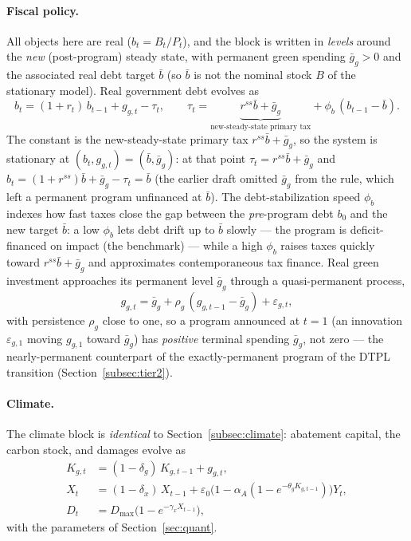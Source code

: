 \documentclass[12pt]{article}
\begin{document}
\paragraph{Fiscal policy.} All objects here are real ($b_t=B_t/P_t$), and the
block is written in \emph{levels} around the \emph{new} (post-program) steady
state, with permanent green spending $\bar g_g>0$ and the associated real debt
target $\bar b$ (so $\bar b$ is not the nominal stock $B$ of the stationary
model). Real government debt evolves as
\begin{equation}
b_t = (1+r_t)\,b_{t-1} + g_{g,t} - \tau_t, \qquad
\tau_t = \underbrace{r^{ss}\bar b + \bar g_g}_{\text{new-steady-state primary tax}}
        + \phi_b\,(b_{t-1}-\bar b).
\label{eq:nk-fiscal}
\end{equation}
The constant is the new-steady-state primary tax $r^{ss}\bar b+\bar g_g$, so the
system is stationary at $(b_t,g_{g,t})=(\bar b,\bar g_g)$: at that point
$\tau_t=r^{ss}\bar b+\bar g_g$ and $b_t=(1+r^{ss})\bar b+\bar g_g-\tau_t=\bar b$
(the earlier draft omitted $\bar g_g$ from the rule, which left a permanent
program unfinanced at $\bar b$). The debt-stabilization speed $\phi_b$ indexes
how fast taxes close the gap between the \emph{pre}-program debt $b_0$ and the
new target $\bar b$: a low $\phi_b$ lets debt drift up to $\bar b$ slowly ---
the program is deficit-financed on impact (the benchmark) --- while a high
$\phi_b$ raises taxes quickly toward $r^{ss}\bar b+\bar g_g$ and approximates
contemporaneous tax finance. Real green investment approaches its permanent
level $\bar g_g$ through a quasi-permanent process,
\begin{equation}
g_{g,t} = \bar g_g + \rho_g\,(g_{g,t-1}-\bar g_g) + \varepsilon_{g,t},
\label{eq:nk-program}
\end{equation}
with persistence $\rho_g$ close to one, so a program announced at $t=1$
(an innovation $\varepsilon_{g,1}$ moving $g_{g,1}$ toward $\bar g_g$) has
\emph{positive} terminal spending $\bar g_g$, not zero --- the nearly-permanent
counterpart of the exactly-permanent program of the DTPL transition
(Section~\ref{subsec:tier2}).

\paragraph{Climate.} The climate block is \emph{identical} to
Section~\ref{subsec:climate}: abatement capital, the carbon stock, and
damages evolve as
\begin{align}
K_{g,t} &= (1-\delta_g)\,K_{g,t-1} + g_{g,t}, \label{eq:nk-kg}\\
X_t &= (1-\delta_x)\,X_{t-1}
      + \varepsilon_0\bigl(1-\alpha_A(1-e^{-\theta_g K_{g,t-1}})\bigr)Y_t,
      \label{eq:nk-carbon}\\
D_t &= D_{\max}\bigl(1-e^{-\gamma_x X_{t-1}}\bigr),
      \label{eq:nk-damages}
\end{align}
with the parameters of Section~\ref{sec:quant}.
\end{document}
